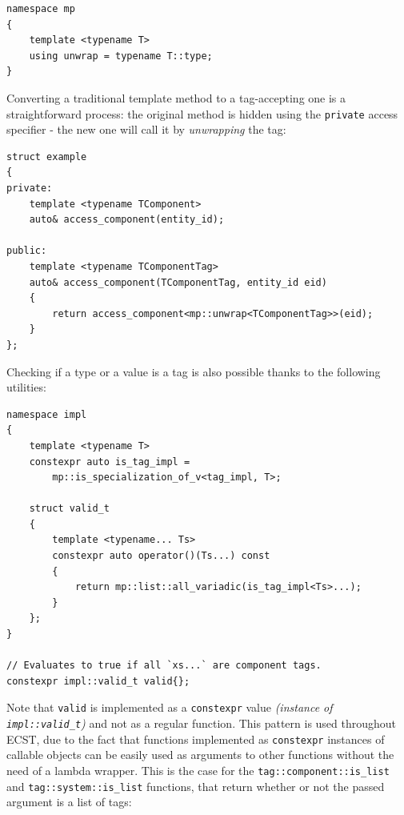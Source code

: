 \documentclass[oneside, 12pt, a4paper, openany]{book}
\begin{document}
\begin{verbatim}
namespace mp
{
    template <typename T>
    using unwrap = typename T::type;
}
\end{verbatim}

Converting a traditional template method to a tag-accepting one is a
straightforward process: the original method is hidden using the
\texttt{private}
access specifier - the new one will call it by \emph{unwrapping} the
tag:

\begin{verbatim}
struct example
{
private:
    template <typename TComponent>
    auto& access_component(entity_id);

public:
    template <typename TComponentTag>
    auto& access_component(TComponentTag, entity_id eid)
    {
        return access_component<mp::unwrap<TComponentTag>>(eid);
    }
};
\end{verbatim}

Checking if a type or a value is a tag is also possible thanks to the
following utilities:

\begin{verbatim}
namespace impl
{
    template <typename T>
    constexpr auto is_tag_impl =
        mp::is_specialization_of_v<tag_impl, T>;

    struct valid_t
    {
        template <typename... Ts>
        constexpr auto operator()(Ts...) const
        {
            return mp::list::all_variadic(is_tag_impl<Ts>...);
        }
    };
}

// Evaluates to true if all `xs...` are component tags.
constexpr impl::valid_t valid{};
\end{verbatim}

Note that
\texttt{valid}
is implemented as a
\texttt{constexpr}
value \emph{(instance of
\texttt{impl::valid_t})}
and not as a regular function. This pattern is used throughout ECST, due
to the fact that functions implemented as
\texttt{constexpr}
instances of callable objects can be easily used as arguments to other
functions without the need of a lambda wrapper. This is the case for the
\texttt{tag::component::is_list}
and
\texttt{tag::system::is_list}
functions, that return whether or not the passed argument is a list of
tags:
\end{document}
